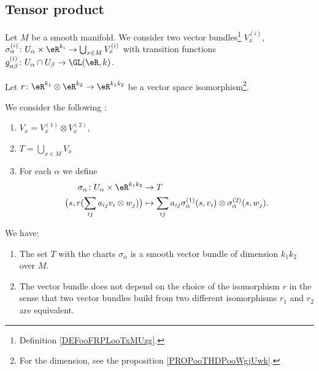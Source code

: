 \subsection{Tensor product}

\begin{propositionDef}		\label{DEFooCSDZooJuzGuE}
	Let \( M \) be a smooth manifold. We consider two vector bundles\footnote{Definition \ref{DEFooFRPLooTxMUzg}.} \( V_x^{(i)}\), \( \sigma_{\alpha}^{(i)}  \colon U_{\alpha}\times \eR^{k_i}\to \bigcup_{x\in M}V_x^{(i)} \) with transition functions \(g_{\alpha\beta}^{(i)} \colon U_{\alpha}\cap U_{\beta}\to \GL(\eR,k)  \).

	Let \(r \colon \eR^{k_1}\otimes \eR^{k_2}\to \eR^{k_1k_2}  \) be a vector space isomorphism\footnote{For the dimension, see the proposition \ref{PROPooTHDPooWgjUwk}.}.

	We consider the following :
	\begin{enumerate}
		\item
		      \( V_x=V_x^{(1)}\otimes V_x^{(2)}\),
		\item
		      \( T=\bigcup_{x\in M}V_x\)
		\item For each \( \alpha\) we define
		      \begin{equation}
			      \begin{aligned}
				      \sigma_{\alpha}\colon U_{\alpha}\times \eR^{k_1k_2} & \to T                                                                                    \\
				      \big( s, r(\sum_{ij}a_{ij} v_i\otimes w_j) \big)    & \mapsto \sum_{ij}a_{ij}\sigma_{\alpha}^{(1)}(s,v_i)\otimes \sigma_{\alpha}^{(2)}(s,w_j).
			      \end{aligned}
		      \end{equation}
	\end{enumerate}

	We have:
	\begin{enumerate}
		\item
		      The set	\( T\) with the charts \( \sigma_{\alpha} \) is a smooth vector bundle of dimension \( k_1k_2\) over \( M\).
		\item
		      The vector bundle does not depend on the choice of the isomorphism \( r\) in the sense that two vector bundles build from two different isomorphisms \( r_1\) and \( r_2\) are equivalent.
	\end{enumerate}
\end{propositionDef}


